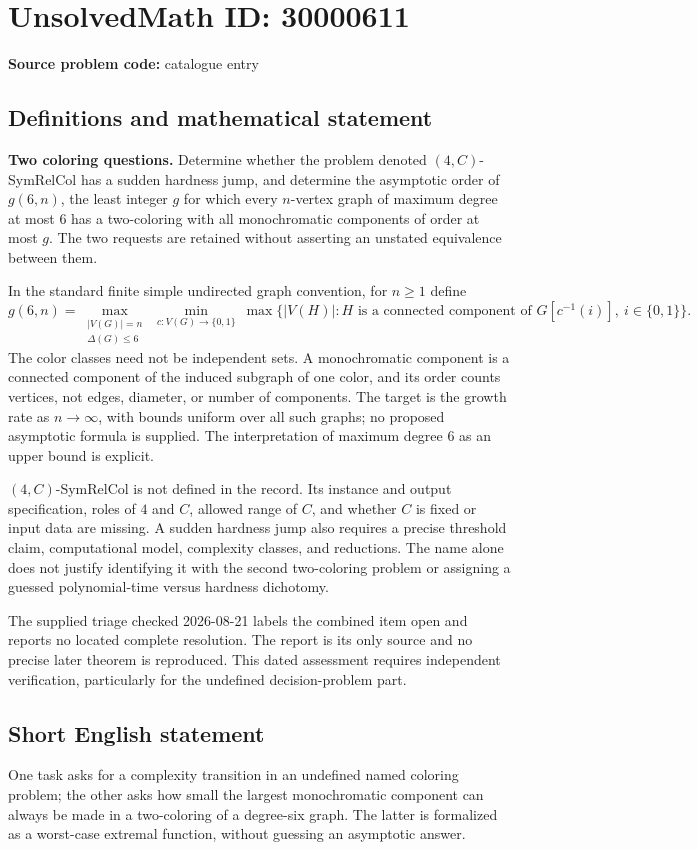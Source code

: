 \documentclass[11pt]{article}
\begin{document}
\section*{UnsolvedMath ID: 30000611}
\textbf{Source problem code:} catalogue entry
\subsection{Definitions and mathematical statement}
\textbf{Two coloring questions.} Determine whether the problem denoted \((4,C)\)-SymRelCol has a sudden hardness jump, and determine the asymptotic order of \(g(6,n)\), the least integer \(g\) for which every \(n\)-vertex graph of maximum degree at most \(6\) has a two-coloring with all monochromatic components of order at most \(g\). The two requests are retained without asserting an unstated equivalence between them.\par In the standard finite simple undirected graph convention, for \(n\ge1\) define\[g(6,n)=\max_{\substack{|V(G)|=n\\\Delta(G)\le6}}\ \min_{c:V(G)\to\{0,1\}}\ \max\{|V(H)|:H\text{ is a connected component of }G[c^{-1}(i)],\ i\in\{0,1\}\}.\] The color classes need not be independent sets. A monochromatic component is a connected component of the induced subgraph of one color, and its order counts vertices, not edges, diameter, or number of components. The target is the growth rate as \(n\to\infty\), with bounds uniform over all such graphs; no proposed asymptotic formula is supplied. The interpretation of maximum degree \(6\) as an upper bound is explicit.\par \((4,C)\)-SymRelCol is not defined in the record. Its instance and output specification, roles of \(4\) and \(C\), allowed range of \(C\), and whether \(C\) is fixed or input data are missing. A sudden hardness jump also requires a precise threshold claim, computational model, complexity classes, and reductions. The name alone does not justify identifying it with the second two-coloring problem or assigning a guessed polynomial-time versus hardness dichotomy.\par The supplied triage checked 2026-08-21 labels the combined item open and reports no located complete resolution. The report is its only source and no precise later theorem is reproduced. This dated assessment requires independent verification, particularly for the undefined decision-problem part.
\subsection{Short English statement}
One task asks for a complexity transition in an undefined named coloring problem; the other asks how small the largest monochromatic component can always be made in a two-coloring of a degree-six graph. The latter is formalized as a worst-case extremal function, without guessing an asymptotic answer.
\end{document}
